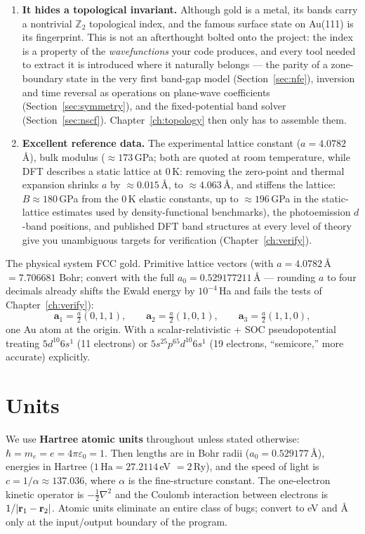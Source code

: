 \begin{enumerate}[leftmargin=2em]
\item \textbf{It hides a topological invariant.} Although gold is a metal,
its bands carry a nontrivial $\mathbb{Z}_2$ topological index, and the famous
surface state on Au(111) is its fingerprint. This is not an afterthought
bolted onto the project: the index is a property of the \emph{wavefunctions}
your code produces, and every tool needed to extract it is introduced where
it naturally belongs --- the parity of a zone-boundary state in the very
first band-gap model (Section~\ref{sec:nfe}), inversion and time reversal as
operations on plane-wave coefficients (Section~\ref{sec:symmetry}), and the
fixed-potential band solver (Section~\ref{sec:nscf}).
Chapter~\ref{ch:topology} then only has to assemble them.

\item \textbf{Excellent reference data.} The experimental lattice constant
($a = 4.0782$\,\AA), bulk modulus ($\approx 173$\,GPa; both are quoted at
room temperature, while DFT describes a static lattice at $0$\,K: removing the
zero-point and thermal expansion shrinks $a$ by $\approx 0.015$\,\AA{}, to
$\approx 4.063$\,\AA, and stiffens the lattice: $B \approx 180$\,GPa from the
$0$\,K elastic constants, up to $\approx 196$\,GPa in the static-lattice
estimates used by density-functional benchmarks), the photoemission
$d$-band positions, and published DFT band structures at every level of
theory give you unambiguous targets for verification
(Chapter~\ref{ch:verify}).
\end{enumerate}

\begin{keybox}{The physical system}
FCC gold. Primitive lattice vectors (with $a = 4.0782$\,\AA{}
$= 7.706681$ Bohr; convert with the full $a_0 = 0.529177211$\,\AA{} ---
rounding $a$ to four decimals already shifts the Ewald energy by
$10^{-4}$\,Ha and fails the tests of Chapter~\ref{ch:verify}):
\[
\mathbf{a}_1 = \tfrac{a}{2}(0,1,1),\qquad
\mathbf{a}_2 = \tfrac{a}{2}(1,0,1),\qquad
\mathbf{a}_3 = \tfrac{a}{2}(1,1,0),
\]
one Au atom at the origin. With a scalar-relativistic + SOC pseudopotential
treating $5d^{10}6s^1$ (11 electrons) or $5s^25p^65d^{10}6s^1$ (19 electrons,
``semicore,'' more accurate) explicitly.
\end{keybox}

\section{Units}

We use \textbf{Hartree atomic units} throughout unless stated otherwise:
$\hbar = m_e = e = 4\pi\varepsilon_0 = 1$. Then lengths are in Bohr radii
($a_0 = 0.529177$\,\AA), energies in Hartree ($1\,\mathrm{Ha} = 27.2114$\,eV
$= 2$\,Ry), and the speed of light is $c = 1/\alpha \approx 137.036$, where
$\alpha$ is the fine-structure constant. The one-electron kinetic operator is
$-\tfrac12\nabla^2$ and the Coulomb interaction between electrons is
$1/|\mathbf{r}_1-\mathbf{r}_2|$. Atomic units eliminate an entire class of bugs; convert to
eV and \AA{} only at the input/output boundary of the program.

